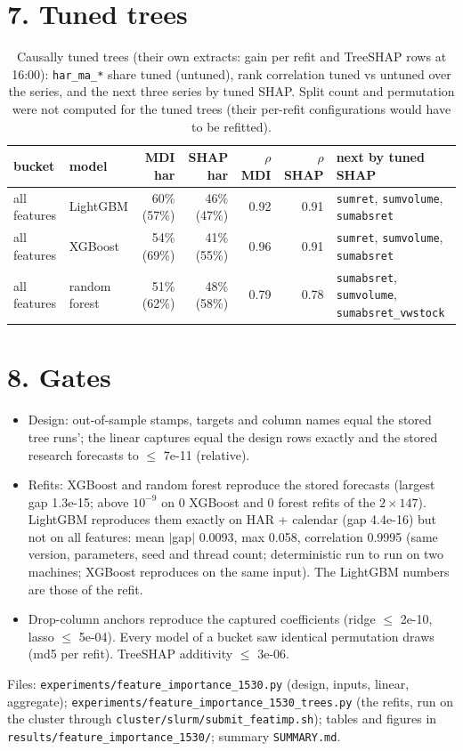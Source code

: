 \documentclass[10pt]{article}
\begin{document}
\section*{7. Tuned trees}
\begin{table}[H]\centering\scriptsize
\caption{Causally tuned trees (their own extracts: gain per refit and TreeSHAP rows at 16:00): \texttt{har\_ma\_*} share tuned (untuned), rank correlation tuned vs untuned over the series, and the next three series by tuned SHAP. Split count and permutation were not computed for the tuned trees (their per-refit configurations would have to be refitted).}
\begin{tabular}{llrrrrp{5cm}}\toprule
bucket & model & MDI har & SHAP har & $\rho$ MDI & $\rho$ SHAP & next by tuned SHAP\\\midrule
all features & LightGBM & 60\% (57\%) & 46\% (47\%) & 0.92 & 0.91 & \texttt{sumret}, \texttt{sumvolume}, \texttt{sumabsret} \\
all features & XGBoost & 54\% (69\%) & 41\% (55\%) & 0.96 & 0.91 & \texttt{sumret}, \texttt{sumvolume}, \texttt{sumabsret} \\
all features & random forest & 51\% (62\%) & 48\% (58\%) & 0.79 & 0.78 & \texttt{sumabsret}, \texttt{sumvolume}, \texttt{sumabsret\_vwstock} \\
\bottomrule\end{tabular}\end{table}

\section*{8. Gates}
\begin{itemize}\itemsep1pt
\item Design: out-of-sample stamps, targets and column names equal the stored tree runs'; the linear captures equal the design rows exactly and the stored research forecasts to $\le$ 7e-11 (relative).
\item Refits: XGBoost and random forest reproduce the stored forecasts (largest gap 1.3e-15; above $10^{-9}$ on 0 XGBoost and 0 forest refits of the $2\times147$). LightGBM reproduces them exactly on HAR + calendar (gap 4.4e-16) but not on all features: mean $|$gap$|$ 0.0093, max 0.058, correlation 0.9995 (same version, parameters, seed and thread count; deterministic run to run on two machines; XGBoost reproduces on the same input). The LightGBM numbers are those of the refit.
\item Drop-column anchors reproduce the captured coefficients (ridge $\le$ 2e-10, lasso $\le$ 5e-04). Every model of a bucket saw identical permutation draws (md5 per refit). TreeSHAP additivity $\le$ 3e-06.
\end{itemize}
\sloppy Files: \texttt{experiments/\allowbreak feature\_importance\_1530.py} (design, inputs, linear, aggregate); \texttt{experiments/\allowbreak feature\_importance\_1530\_trees.py} (the refits, run on the cluster through \texttt{cluster/\allowbreak slurm/\allowbreak submit\_featimp.sh}); tables and figures in \texttt{results/\allowbreak feature\_importance\_1530/}; summary \texttt{SUMMARY.md}.
\end{document}
